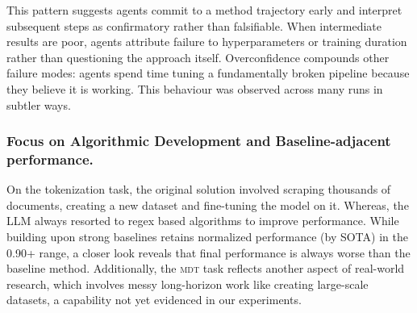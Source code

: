 \documentclass[11pt]{article}
\newcommand{\kw}[1]{{\textsc{\MakeLowercase{#1}}}}
\theoremstyle{plain}
\theoremstyle{definition}
\theoremstyle{remark}
\begin{document}
This pattern suggests agents commit to a method trajectory early and interpret subsequent steps as confirmatory rather than falsifiable. When intermediate results are poor, agents attribute failure to hyperparameters or training duration rather than questioning the approach itself. Overconfidence compounds other failure modes: agents spend time tuning a fundamentally broken pipeline because they believe it is working. This behaviour was observed across many runs in subtler ways.



\subsubsection{Focus on Algorithmic Development and Baseline-adjacent performance.}
On the tokenization task, the original solution involved scraping thousands of documents, creating a new dataset and fine-tuning the model on it. Whereas, the LLM always resorted to regex based algorithms to improve performance. While building upon strong baselines retains normalized performance (by SOTA) in the 0.90+ range, a closer look reveals that final performance is always worse than the baseline method. Additionally, the \kw{mdt} task reflects another aspect of real-world research, which involves messy long-horizon work like creating large-scale datasets, a capability not yet evidenced in our experiments. 
\end{document}
